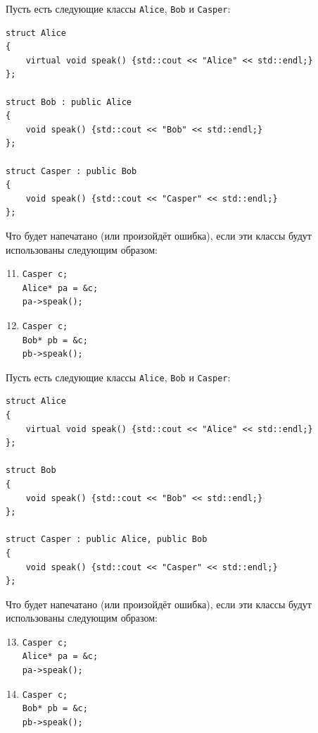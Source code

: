 \documentclass{article}
\begin{document}
\noindent Пусть есть следующие классы \texttt{Alice}, \texttt{Bob} и \texttt{Casper}:
\begin{lstlisting}
struct Alice 
{
    virtual void speak() {std::cout << "Alice" << std::endl;}
};

struct Bob : public Alice 
{
    void speak() {std::cout << "Bob" << std::endl;}
};

struct Casper : public Bob 
{
    void speak() {std::cout << "Casper" << std::endl;}
};
\end{lstlisting}
\noindent Что будет напечатано (или произойдёт ошибка), если эти классы будут использованы следующим образом:

\begin{enumerate}
\setcounter{enumi}{10}
\item \begin{Verbatim}[commandchars=\\\{\}]
Casper c;
Alice* pa = &c;
pa->speak();
\end{Verbatim}

\item \begin{Verbatim}[commandchars=\\\{\}]
Casper c;
Bob* pb = &c;
pb->speak();
\end{Verbatim}
\end{enumerate}

\noindent Пусть есть следующие классы \texttt{Alice}, \texttt{Bob} и \texttt{Casper}:
\begin{lstlisting}
struct Alice 
{
    virtual void speak() {std::cout << "Alice" << std::endl;}
};

struct Bob
{
    void speak() {std::cout << "Bob" << std::endl;}
};

struct Casper : public Alice, public Bob 
{
    void speak() {std::cout << "Casper" << std::endl;}
};
\end{lstlisting}
\noindent Что будет напечатано (или произойдёт ошибка), если эти классы будут использованы следующим образом:

\begin{enumerate}
\setcounter{enumi}{12}
\item \begin{Verbatim}[commandchars=\\\{\}]
Casper c;
Alice* pa = &c;
pa->speak();
\end{Verbatim}

\item \begin{Verbatim}[commandchars=\\\{\}]
Casper c;
Bob* pb = &c;
pb->speak();
\end{Verbatim}
\end{enumerate}
\end{document}

